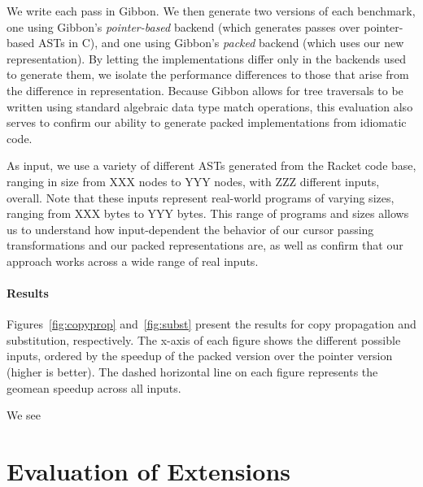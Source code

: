 \documentclass[a4paper,english]{lipics-v2016}
\newcommand{\treelang}{Gibbon\xspace} %
\begin{document}
We write each pass in \treelang{}. We then generate two versions of each
benchmark, one using \treelang{}'s {\em pointer-based} backend (which
generates passes over pointer-based ASTs in C), and one using \treelang{}'s
{\em packed} backend (which uses our new representation). By letting the
implementations differ only in the backends used to generate them, we isolate
the performance differences to those that arise from the difference in
representation. Because \treelang{} allows for tree traversals to be written
using standard algebraic data type match operations, this evaluation also
serves to confirm our ability to generate packed implementations from
idiomatic code.

As input, we use a variety of different ASTs generated from the Racket code
base, ranging in size from XXX nodes to YYY nodes, with ZZZ different inputs,
overall. Note that these inputs represent real-world programs of varying
sizes, ranging from XXX bytes to YYY bytes. This range of programs and sizes
allows us to understand how input-dependent the behavior of our cursor passing
transformations and our packed representations are, as well as confirm that
our approach works across a wide range of real inputs.

\paragraph*{Results}
Figures~\ref{fig:copyprop} and~\ref{fig:subst} present the results
for copy propagation and substitution, respectively. The x-axis of each figure
shows the different possible inputs, ordered by the speedup of the packed
version over the pointer version (higher is better). The dashed horizontal
line on each figure represents the geomean speedup across all inputs.

We see 







\section{Evaluation of Extensions} \label{sec:eval-extensions}
\end{document}

